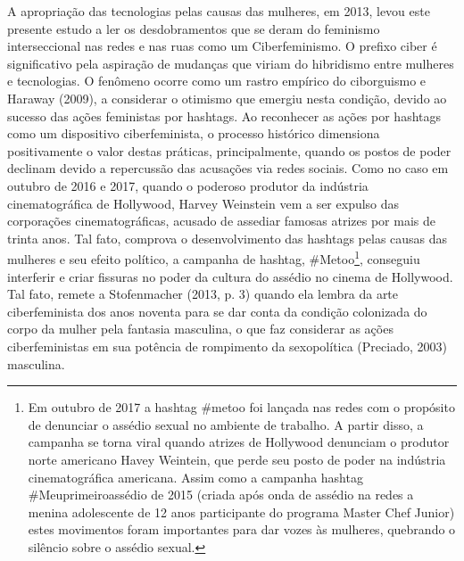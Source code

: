 A apropriação das tecnologias pelas causas das mulheres, em 2013, levou
este presente estudo a ler os desdobramentos que se deram do feminismo
interseccional nas redes e nas ruas como um Ciberfeminismo. O prefixo
ciber é significativo pela aspiração de mudanças que viriam do
hibridismo entre mulheres e tecnologias. O fenômeno ocorre como um
rastro empírico do ciborguismo e Haraway (2009), a considerar o otimismo
que emergiu nesta condição, devido ao sucesso das ações feministas por
hashtags. Ao reconhecer as ações por hashtags como um dispositivo
ciberfeminista, o processo histórico dimensiona positivamente o valor
destas práticas, principalmente, quando os postos de poder declinam
devido a repercussão das acusações via redes sociais. Como no caso em
outubro de 2016 e 2017, quando o poderoso produtor da indústria
cinematográfica de Hollywood, Harvey Weinstein vem a ser expulso das
corporações cinematográficas, acusado de assediar famosas atrizes por
mais de trinta anos. Tal fato, comprova o desenvolvimento das hashtags
pelas causas das mulheres e seu efeito político, a campanha de hashtag,
\#Metoo\footnote{Em outubro de 2017 a hashtag \#metoo foi lançada nas
  redes com o propósito de denunciar o assédio sexual no ambiente de
  trabalho. A partir disso, a campanha se torna viral quando atrizes de
  Hollywood denunciam o produtor norte americano Havey Weintein, que
  perde seu posto de poder na indústria cinematográfica americana. Assim
  como a campanha hashtag \#Meuprimeiroassédio de 2015 (criada após onda
  de assédio na redes a menina adolescente de 12 anos participante do
  programa Master Chef Junior) estes movimentos foram importantes para
  dar vozes às mulheres, quebrando o silêncio sobre o assédio sexual.},
conseguiu interferir e criar fissuras no poder da cultura do assédio no
cinema de Hollywood. Tal fato, remete a Stofenmacher (2013, p. 3) quando
ela lembra da arte ciberfeminista dos anos noventa para se dar conta da
condição colonizada do corpo da mulher pela fantasia masculina, o que
faz considerar as ações ciberfeministas em sua potência de rompimento da
sexopolítica (Preciado, 2003) masculina.

